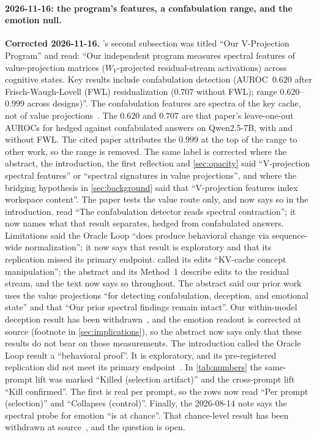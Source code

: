 \documentclass[11pt,a4paper]{article}
\begin{document}
\paragraph{2026-11-16: the program's features, a confabulation range,
and the emotion null.}
\textbf{Corrected 2026-11-16.} 's second
subsection was titled ``Our V-Projection Program'' and read: ``Our
independent program measures spectral features of value-projection
matrices ($W_V$-projected residual-stream activations) across cognitive
states. Key results include confabulation detection (AUROC~$0.620$
after Frisch-Waugh-Lovell (FWL) residualization ($0.707$ without FWL);
range $0.620$--$0.999$ across designs)''. The confabulation features are
spectra of the key cache, not of value projections~\citep{lyra2026oracle}.
The $0.620$ and $0.707$ are that paper's leave-one-out AUROCs for hedged
against confabulated answers on Qwen2.5-7B, with and without FWL. The
cited paper attributes the $0.999$ at the top of the range to other
work, so the range is removed. The same label is corrected where the
abstract, the introduction, the first reflection and \cref{sec:opacity}
said ``V-projection spectral features'' or ``spectral signatures in
value projections'', and where the bridging hypothesis in
\cref{sec:background} said that ``V-projection features index workspace
content''. The paper tests the value route only, and now says so in the
introduction.  read ``The confabulation detector reads
spectral contraction''; it now names what that result separates,
hedged from confabulated answers. Limitations said the Oracle Loop ``does produce behavioral
change via sequence-wide normalization''; it now says that result is
exploratory and that its replication missed its primary endpoint.
 called its edits ``KV-cache concept manipulation''; the
abstract and its Method~1 describe edits to the residual stream, and the
text now says so throughout. The abstract said our prior work uses the value
projections ``for detecting confabulation, deception, and emotional
state'' and that ``Our prior spectral findings remain intact''. Our
within-model deception result has been withdrawn~\citep{lyra2026oracle},
and the emotion
readout is corrected at source (footnote in \cref{sec:implications}), so
the abstract now says only that these results do not bear on those
measurements. The introduction called the Oracle Loop result a
``behavioral proof''. It is exploratory, and its pre-registered
replication did not meet its primary endpoint~\citep{cc2026targeted}. In
\cref{tab:numbers} the same-prompt lift was marked ``Killed (selection
artifact)'' and the cross-prompt lift ``Kill confirmed''. The first is
real per prompt, so the rows now read ``Per prompt (selection)''
and ``Collapses (control)''. Finally, the 2026-08-14 note says the
spectral probe for emotion ``is at chance''. That chance-level result
has been withdrawn at source~\citep{lyra2026usermodel}, and the question
is open.
\end{document}
